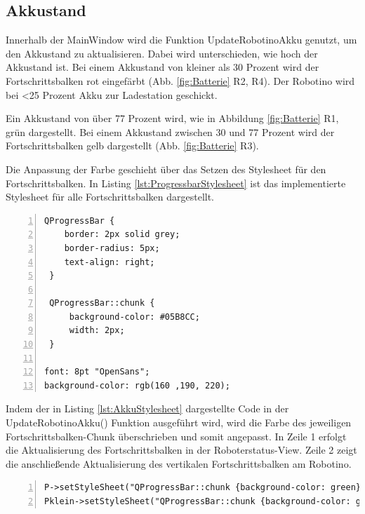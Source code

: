 \subsection{Akkustand}

Innerhalb der MainWindow wird die Funktion UpdateRobotinoAkku genutzt, um den Akkustand zu aktualisieren. Dabei wird unterschieden, wie hoch der Akkustand ist. Bei einem Akkustand von kleiner als 30 Prozent wird der Fortschrittsbalken rot eingefärbt (Abb. \ref{fig:Batterie} R2, R4). Der Robotino wird bei <25 Prozent Akku zur Ladestation geschickt. 

Ein Akkustand von über 77 Prozent wird, wie in Abbildung \ref{fig:Batterie} R1, grün dargestellt. Bei einem Akkustand zwischen 30 und 77 Prozent wird der Fortschrittsbalken gelb dargestellt (Abb. \ref{fig:Batterie} R3). 

Die Anpassung der Farbe geschieht über das Setzen des Stylesheet für den Fortschrittsbalken. In Listing \ref{lst:ProgressbarStylesheet} ist das implementierte Stylesheet für alle Fortschrittsbalken dargestellt. 

\begin{lstlisting}[frame=single, breaklines=true, numbers=left, stepnumber=2, firstnumber=1, numberstyle = \tiny, caption=Progressbar Stylesheet ,label=lst:ProgressbarStylesheet]
QProgressBar {
    border: 2px solid grey;
    border-radius: 5px;
	text-align: right;
 }

 QProgressBar::chunk {
     background-color: #05B8CC;
     width: 2px;
 }

font: 8pt "OpenSans";
background-color: rgb(160 ,190, 220);
\end{lstlisting}

Indem der in Listing \ref{lst:AkkuStylesheet} dargestellte Code in der UpdateRobotinoAkku() Funktion ausgeführt wird, wird die Farbe des jeweiligen Fortschrittsbalken-Chunk überschrieben und somit angepasst. In Zeile 1 erfolgt die Aktualisierung des Fortschrittsbalken in der Roboterstatus-View. Zeile 2 zeigt die anschließende Aktualisierung des vertikalen Fortschrittsbalken am Robotino. 

\begin{lstlisting}[frame=single, breaklines=true, numbers=left, stepnumber=2, firstnumber=1, numberstyle = \tiny, caption=Stylesheet Aktualisierung der Akku-Progressbar ,label=lst:AkkuStylesheet]
P->setStyleSheet("QProgressBar::chunk {background-color: green}");
Pklein->setStyleSheet("QProgressBar::chunk {background-color: green}");
\end{lstlisting}

